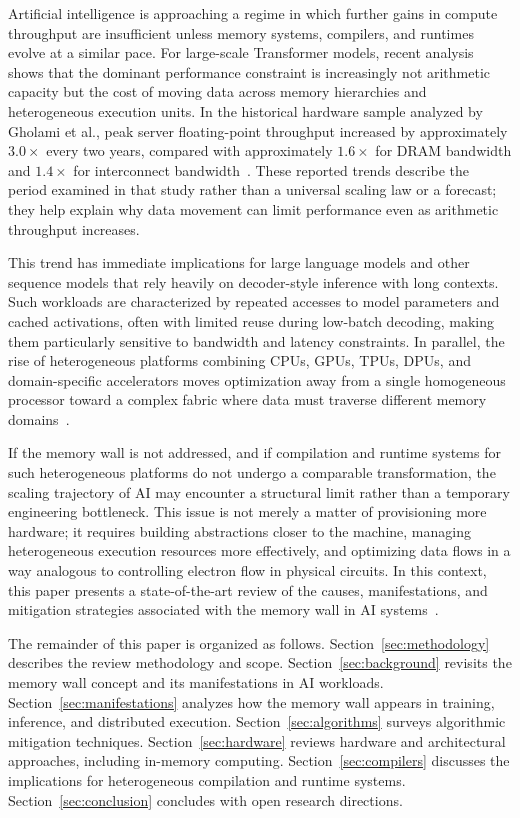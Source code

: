 \documentclass[conference]{IEEEtran}
\begin{document}
Artificial intelligence is approaching a regime in which further gains in compute throughput are insufficient unless memory systems, compilers, and runtimes evolve at a similar pace. For large-scale Transformer models, recent analysis shows that the dominant performance constraint is increasingly not arithmetic capacity but the cost of moving data across memory hierarchies and heterogeneous execution units. In the historical hardware sample analyzed by Gholami et al., peak server floating-point throughput increased by approximately $3.0\times$ every two years, compared with approximately $1.6\times$ for DRAM bandwidth and $1.4\times$ for interconnect bandwidth~\cite{gholami2024ai}. These reported trends describe the period examined in that study rather than a universal scaling law or a forecast; they help explain why data movement can limit performance even as arithmetic throughput increases.

This trend has immediate implications for large language models and other sequence models that rely heavily on decoder-style inference with long contexts. Such workloads are characterized by repeated accesses to model parameters and cached activations, often with limited reuse during low-batch decoding, making them particularly sensitive to bandwidth and latency constraints. In parallel, the rise of heterogeneous platforms combining CPUs, GPUs, TPUs, DPUs, and domain-specific accelerators moves optimization away from a single homogeneous processor toward a complex fabric where data must traverse different memory domains~\cite{gholami2024ai,roy2025breaking}.

If the memory wall is not addressed, and if compilation and runtime systems for such heterogeneous platforms do not undergo a comparable transformation, the scaling trajectory of AI may encounter a structural limit rather than a temporary engineering bottleneck. This issue is not merely a matter of provisioning more hardware; it requires building abstractions closer to the machine, managing heterogeneous execution resources more effectively, and optimizing data flows in a way analogous to controlling electron flow in physical circuits. In this context, this paper presents a state-of-the-art review of the causes, manifestations, and mitigation strategies associated with the memory wall in AI systems~\cite{gholami2024ai,roy2025breaking}.

The remainder of this paper is organized as follows. Section~\ref{sec:methodology} describes the review methodology and scope. Section~\ref{sec:background} revisits the memory wall concept and its manifestations in AI workloads. Section~\ref{sec:manifestations} analyzes how the memory wall appears in training, inference, and distributed execution. Section~\ref{sec:algorithms} surveys algorithmic mitigation techniques. Section~\ref{sec:hardware} reviews hardware and architectural approaches, including in-memory computing. Section~\ref{sec:compilers} discusses the implications for heterogeneous compilation and runtime systems. Section~\ref{sec:conclusion} concludes with open research directions.
\end{document}
